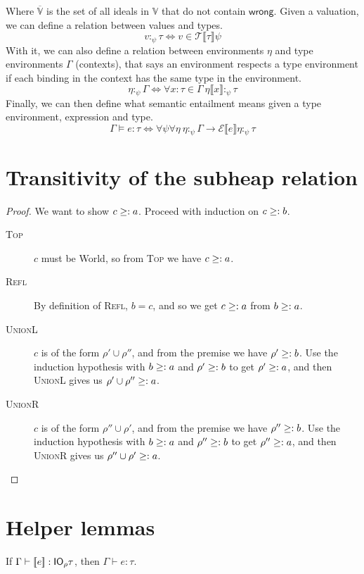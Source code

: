 Where $\overline{\mathbb{V}}$ is the set of all ideals in $\mathbb{V}$
that do not contain $\mathsf{wrong}$. 
Given a valuation, we can define a relation between values and types.
\[ v :_\psi \tau \iff v \in \mathcal{T} \llbracket \tau \rrbracket\psi \]
With it, we can also define a relation between environments $\eta$ and
type environments $\Gamma$ (contexts), that says an environment respects a
type environment if each binding
in the context has the same type in the environment.
\[ \eta :_\psi \Gamma \iff \forall x : \tau \in \Gamma \ \eta\llbracket x \rrbracket :_\psi \tau\]
Finally, we can then define what semantic entailment means
given a type environment, expression and type.
\[
  \Gamma \vDash e : \tau \iff \forall \psi \forall \eta \ \eta:_\psi \Gamma \rightarrow \mathcal{E} \llbracket e \rrbracket \eta :_\psi \tau
\]

\section{Transitivity of the subheap relation}\label{proof:subheaptransitive}
\begin{proof}
  We want to show $c \geq: a$. Proceed with induction on $c \geq: b$.
  \begin{description}
  \item[\rm\textsc{Top}]
    $c$ must be \textsf{World}, so from \textsc{Top} we have $c
    \geq: a$.
  \item[\rm\textsc{Refl}] By definition of \textsc{Refl}, $b =
    c$, and so we get $c \geq: a$ from $b \geq: a$.
  \item[\rm\textsc{UnionL}] $c$ is of the form $\rho' \cup \rho''$, and
    from the premise we have $\rho' \geq: b$. Use the induction
    hypothesis with $b \geq: a$ and $\rho' \geq: b$ to get $\rho' \geq:
    a$, and then \textsc{UnionL} gives us $\rho' \cup \rho'' \geq: a$.
  \item[\rm\textsc{UnionR}]  $c$ is of the form $\rho'' \cup \rho'$, and
    from the premise we have $\rho'' \geq: b$. Use the induction
    hypothesis with $b \geq: a$ and $\rho'' \geq: b$ to get $\rho''
    \geq: a$, and then \textsc{UnionR} gives us $\rho'' \cup \rho' \geq: a$.
  \end{description}
\end{proof}

\section{Helper lemmas}
\begin{lemma}\label{lem:unwrapLift}
  If $\Gamma \vdash [\![ e]\!] : \mathsf{IO}_\rho \tau$, then $\Gamma \vdash e : \tau$.
\end{lemma}

